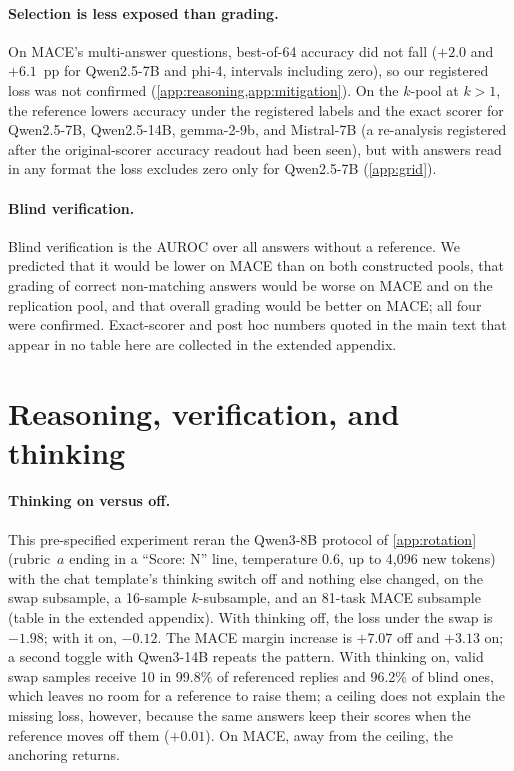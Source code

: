 \paragraph{Selection is less exposed than grading.}
On \textsc{MACE}'s multi-answer questions, best-of-64 accuracy did not fall ($+2.0$ and $+6.1$~pp for Qwen2.5-7B and phi-4, intervals including zero), so our registered loss was not confirmed (\cref{app:reasoning,app:mitigation}). On the $k$-pool at $k{>}1$, the reference lowers accuracy under the registered labels and the exact scorer for Qwen2.5-7B, Qwen2.5-14B, gemma-2-9b, and Mistral-7B (a re-analysis registered after the original-scorer accuracy readout had been seen), but with answers read in any format the loss excludes zero only for Qwen2.5-7B (\cref{app:grid}).

\paragraph{Blind verification.}
Blind verification is the AUROC over all answers without a reference. We predicted that it would be lower on \textsc{MACE} than on both constructed pools, that grading of correct non-matching answers would be worse on \textsc{MACE} and on the replication pool, and that overall grading would be better on \textsc{MACE}; all four were confirmed.\pre{} Exact-scorer and post hoc numbers quoted in the main text that appear in no table here are collected in the extended appendix.

\FloatBarrier
\section{Reasoning, verification, and thinking}
\label{app:reasoning}
\paragraph{Thinking on versus off.}
This pre-specified experiment reran the Qwen3-8B protocol of \cref{app:rotation} (rubric~$a$ ending in a ``Score: N'' line, temperature 0.6, up to 4,096 new tokens) with the chat template's thinking switch off and nothing else changed, on the swap subsample, a 16-sample $k$-subsample, and an 81-task \textsc{MACE} subsample (table in the extended appendix). With thinking off, the loss under the swap is $-1.98$; with it on, $-0.12$. The \textsc{MACE} margin increase is $+7.07$ off and $+3.13$ on; a second toggle with Qwen3-14B repeats the pattern. With thinking on, valid swap samples receive 10 in 99.8\% of referenced replies and 96.2\% of blind ones, which leaves no room for a reference to raise them; a ceiling does not explain the missing loss, however, because the same answers keep their scores when the reference moves off them ($+0.01$). On \textsc{MACE}, away from the ceiling, the anchoring returns.


